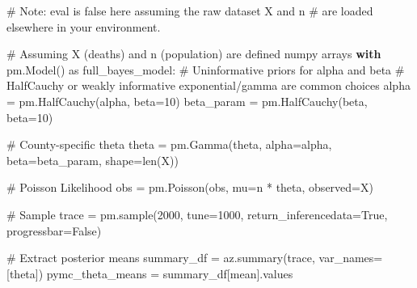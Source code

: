 \documentclass[
  letterpaper,
  DIV=11,
  numbers=noendperiod]{scrartcl}
\newenvironment{Shaded}{\begin{snugshade}}{\end{snugshade}}
\newcommand{\BuiltInTok}[1]{\textcolor[rgb]{0.00,0.23,0.31}{#1}}
\newcommand{\CommentTok}[1]{\textcolor[rgb]{0.37,0.37,0.37}{#1}}
\newcommand{\ControlFlowTok}[1]{\textcolor[rgb]{0.00,0.23,0.31}{\textbf{#1}}}
\newcommand{\DecValTok}[1]{\textcolor[rgb]{0.68,0.00,0.00}{#1}}
\newcommand{\ImportTok}[1]{\textcolor[rgb]{0.00,0.46,0.62}{#1}}
\newcommand{\NormalTok}[1]{\textcolor[rgb]{0.00,0.23,0.31}{#1}}
\newcommand{\OperatorTok}[1]{\textcolor[rgb]{0.37,0.37,0.37}{#1}}
\newcommand{\StringTok}[1]{\textcolor[rgb]{0.13,0.47,0.30}{#1}}
\newcommand{\VariableTok}[1]{\textcolor[rgb]{0.07,0.07,0.07}{#1}}
\begin{document}
\begin{Shaded}
\begin{Highlighting}[]
\CommentTok{\# Note: eval is false here assuming the raw dataset \textquotesingle{}X\textquotesingle{} and \textquotesingle{}n\textquotesingle{} }
\CommentTok{\# are loaded elsewhere in your environment.}

\CommentTok{\# Assuming X (deaths) and n (population) are defined numpy arrays}
\ControlFlowTok{with}\NormalTok{ pm.Model() }\ImportTok{as}\NormalTok{ full\_bayes\_model:}
    \CommentTok{\# Uninformative priors for alpha and beta}
    \CommentTok{\# HalfCauchy or weakly informative exponential/gamma are common choices}
\NormalTok{    alpha }\OperatorTok{=}\NormalTok{ pm.HalfCauchy(}\StringTok{\textquotesingle{}alpha\textquotesingle{}}\NormalTok{, beta}\OperatorTok{=}\DecValTok{10}\NormalTok{)}
\NormalTok{    beta\_param }\OperatorTok{=}\NormalTok{ pm.HalfCauchy(}\StringTok{\textquotesingle{}beta\textquotesingle{}}\NormalTok{, beta}\OperatorTok{=}\DecValTok{10}\NormalTok{)}
    
    \CommentTok{\# County{-}specific theta}
\NormalTok{    theta }\OperatorTok{=}\NormalTok{ pm.Gamma(}\StringTok{\textquotesingle{}theta\textquotesingle{}}\NormalTok{, alpha}\OperatorTok{=}\NormalTok{alpha, beta}\OperatorTok{=}\NormalTok{beta\_param, shape}\OperatorTok{=}\BuiltInTok{len}\NormalTok{(X))}
    
    \CommentTok{\# Poisson Likelihood}
\NormalTok{    obs }\OperatorTok{=}\NormalTok{ pm.Poisson(}\StringTok{\textquotesingle{}obs\textquotesingle{}}\NormalTok{, mu}\OperatorTok{=}\NormalTok{n }\OperatorTok{*}\NormalTok{ theta, observed}\OperatorTok{=}\NormalTok{X)}
    
    \CommentTok{\# Sample}
\NormalTok{    trace }\OperatorTok{=}\NormalTok{ pm.sample(}\DecValTok{2000}\NormalTok{, tune}\OperatorTok{=}\DecValTok{1000}\NormalTok{, return\_inferencedata}\OperatorTok{=}\VariableTok{True}\NormalTok{, progressbar}\OperatorTok{=}\VariableTok{False}\NormalTok{)}

\CommentTok{\# Extract posterior means}
\NormalTok{summary\_df }\OperatorTok{=}\NormalTok{ az.summary(trace, var\_names}\OperatorTok{=}\NormalTok{[}\StringTok{\textquotesingle{}theta\textquotesingle{}}\NormalTok{])}
\NormalTok{pymc\_theta\_means }\OperatorTok{=}\NormalTok{ summary\_df[}\StringTok{\textquotesingle{}mean\textquotesingle{}}\NormalTok{].values}
\end{Highlighting}
\end{Shaded}
\end{document}
